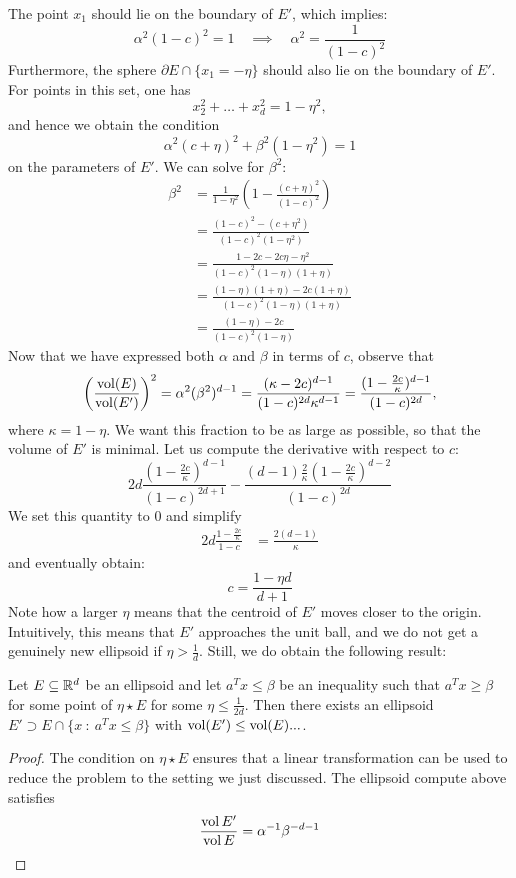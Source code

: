 The point $x_1$ should lie on the boundary of $E'$, which implies:
\[
  \alpha^2 (1-c)^2 = 1 \quad\implies\quad \alpha^2 = \frac{1}{(1-c)^2}
\]
Furthermore, the sphere $\partial E \cap \{ x_1 = -\eta \}$ should also lie on the boundary of $E'$.
For points in this set, one has
\[
  x_2^2 + \dots + x_d^2 = 1 - \eta^2,
\]
and hence we obtain the condition
\[
  \alpha^2 (c + \eta)^2 + \beta^2 (1 -\eta^2) = 1
\]
on the parameters of $E'$.
We can solve for $\beta^2$:
\begin{align*}
  \beta^2
    &= \frac{1}{1 - \eta^2} \left( 1 - \frac{(c+\eta)^2}{(1-c)^2} \right) \\
    &= \frac{(1-c)^2 - (c+\eta^2)}{(1-c)^2 (1-\eta^2)} \\
    &= \frac{1-2c - 2c\eta - \eta^2}{(1-c)^2 (1-\eta)(1+\eta)} \\
    &= \frac{(1-\eta)(1+\eta) - 2c(1 + \eta)}{(1-c)^2 (1-\eta)(1+\eta)} \\
    &= \frac{(1-\eta) - 2c}{(1-c)^2 (1-\eta)}
\end{align*}
Now that we have expressed both $\alpha$ and $\beta$ in terms of $c$,
observe that
\[
  \left(\frac{\operatorname{vol}(E)}{\operatorname{vol}(E')}\right)^2 = \alpha^2 (\beta^2)^{d-1} = \frac{(\kappa - 2c)^{d-1}}{(1-c)^{2d} \kappa^{d-1}} = \frac{(1 - \frac{2c}{\kappa})^{d-1}}{(1-c)^{2d}},
\]
where $\kappa = 1 - \eta$.
We want this fraction to be as large as possible,
so that the volume of $E'$ is minimal.
Let us compute the derivative with respect to $c$:
\[
  2d \frac{(1 - \frac{2c}{\kappa})^{d-1}}{(1-c)^{2d+1}} - \frac{(d-1) \frac{2}{\kappa} (1-\frac{2c}{\kappa})^{d-2}}{(1-c)^{2d}}
\]
We set this quantity to $0$ and simplify
\begin{align*}
  2d\frac{1-\frac{2c}{\kappa}}{1-c} &= \frac{2(d-1)}{\kappa}
\end{align*}
and eventually obtain:
\[
  c = \frac{1 - \eta d}{d + 1}
\]
Note how a larger $\eta$ means that the centroid of $E'$ moves closer to the origin.
Intuitively, this means that $E'$ approaches the unit ball,
and we do not get a genuinely new ellipsoid if $\eta > \frac{1}{d}$.
Still, we do obtain the following result:

\begin{lemma}
  Let $E \subseteq \mathbb{R}^d$ be an ellipsoid and let
  $a^Tx \leq \beta$ be an inequality such that $a^Tx \geq \beta$ for some point of $\eta \star E$ for some $\eta \leq \frac{1}{2d}$.
  Then there exists an ellipsoid $E' \supset E \cap \{ x ~:~ a^Tx \leq \beta \}$
  with $\operatorname{vol}(E') \leq \operatorname{vol}(E) ...$.
\end{lemma}
\begin{proof}
  The condition on $\eta \star E$ ensures that a linear transformation can be used to reduce the problem to the setting we just discussed.
  The ellipsoid compute above satisfies
  \begin{align*}
    \frac{\operatorname{vol} E'}{\operatorname{vol} E} = \alpha^{-1} \beta^{-{d-1}}
  \end{align*}
\end{proof}













